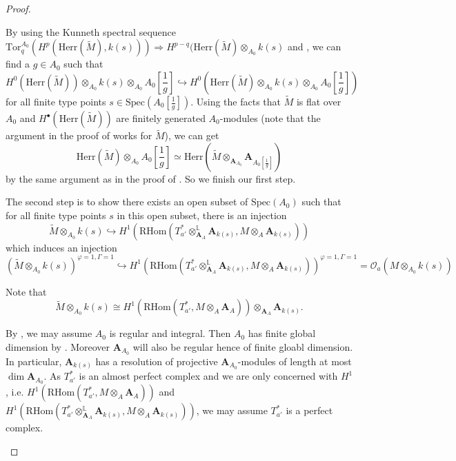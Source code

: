 \documentclass[10pt]{article}
\numberwithin{equation}{section}
\newcommand{\bL}{{\mathbb L}}
\newcommand{\calO}{{\mathcal O}}
\newcommand{\Spec}{{\mathrm{Spec}}}         %
\newcommand{\Tor}{{\mathrm{{Tor}}}}         %
\newcommand{\Herr}{{\mathrm{Herr}}}
\newcommand{\bfA}{{\textbf{A}}}
\newcommand{\RHom}{{\mathrm{RHom}}}
\begin{document}
\begin{proof}
\begin{enumerate}
        By using the Kunneth spectral sequence $\Tor^{A_0}_q(H^p(\Herr(\tilde M),k(s)))\Longrightarrow H^{p-q}(\Herr(\tilde M)\otimes_{A_0}k(s)$ and \cite[\href{https://stacks.math.columbia.edu/tag/0529}{Tag 0529}]{stacks-project}, we can find a $g\in A_0$ such that \[H^0(\Herr(\tilde M))\otimes_{A_0}k(s)\otimes_{A_0}A_0[\frac{1}{g}]\hookrightarrow H^0(\Herr(\tilde M)\otimes_{A_0}k(s)\otimes_{A_0}A_0[\frac{1}{g}])\] for all finite type points $s\in \Spec(A_0[\frac{1}{g}])$. Using the facts that $\tilde M$ is flat over $A_0$ and $H^{\bullet}(\Herr(\tilde M))$ are finitely generated $A_0$-modules (note that the argument in the proof of \cite[Theorem 5.1.22(1)]{EG22} works for $\tilde M$), we can get 
        \[
        \Herr(\tilde M)\otimes_{A_0}A_0[\frac{1}{g}]\simeq \Herr(\tilde M\otimes_{\bfA_{A_0}}\bfA_{A_0[\frac{1}{g}]})
        \]
        by the same argument as in the proof of \cite[Theorem 5.1.22(2)]{EG22}. So we finish our first step.

        The second step is to show there exists an open subset of $\Spec(A_0)$ such that for all finite type points $s$ in this open subset, there is an injection
        \begin{equation}\label{step2}
       \tilde M\otimes_{A_0}k(s)\hookrightarrow H^1(  \RHom(T^*_{a'}\otimes^{\bL}_{\bfA_{A}}\bfA_{k(s)},M\otimes_{A}\bfA_{k(s)}))
        \end{equation}
        which induces an injection 
        \[
        (\tilde M\otimes_{A_0}k(s))^{\varphi=1,\Gamma=1}\hookrightarrow H^1(  \RHom(T^*_{a'}\otimes^{\bL}_{\bfA_{A}}\bfA_{k(s)},M\otimes_{A}\bfA_{k(s)}))^{\varphi=1,\Gamma=1}=\calO_a(M\otimes_{A_0}k(s))
        \]

        Note that 
        \[
       \tilde M\otimes_{A_0}k(s)\cong H^1(\RHom(T^*_{a'},M\otimes_A\bfA_A))\otimes_{\bfA_A}\bfA_{k(s)}.
       \]

 By \cite[\href{https://stacks.math.columbia.edu/tag/056V}{Tag 056V}]{stacks-project}, we may assume $A_0$ is regular and integral. Then $A_0$ has finite global dimension by \cite[\href{https://stacks.math.columbia.edu/tag/00OE}{Tag 00OE}]{stacks-project}. Moreover $\bfA_{A_0}$ will also be regular hence of finite gloabl dimension. In particular, $\bfA_{k(s)}$ has a resolution of projective $\bfA_{A_0}$-modules of length at most $\dim \bfA_{A_0}$. As $T^*_{a'}$ is an almost perfect complex and we are only concerned with $H^1$, i.e. $H^1(\RHom(T^*_{a'},M\otimes_A\bfA_A))$ and $H^1(  \RHom(T^*_{a'}\otimes^{\bL}_{\bfA_{A}}\bfA_{k(s)},M\otimes_{A}\bfA_{k(s)}))$, we may assume $T^*_{a'}$ is a perfect complex.


\end{enumerate}
\end{proof}
\end{document}
